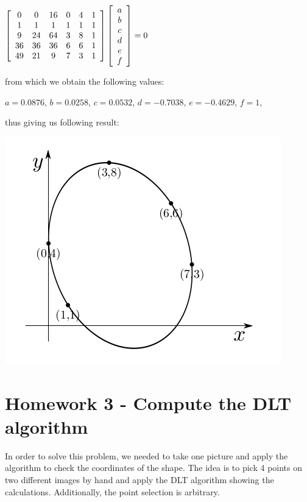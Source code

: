 \documentclass[]{article}
\begin{document}
\centerline {
	$\left[ {\begin{array}{*{20}c}
			0 & 0 & 16 & 0 & 4 & 1 \\
			1 & 1 & 1  & 1 & 1 & 1 \\
			9 & 24 & 64  & 3 & 8 & 1 \\
			36 & 36 & 36  & 6 & 6 & 1 \\
			49 & 21 & 9  & 7 & 3 & 1\\   
	\end{array} } \right] 
	\left[ {\begin{array}{*{20}c}
			a \\ 
			b \\ 
			c \\ 
			d \\ 
			e \\ 
			f    
	\end{array} } \right] = 0 $
}

from which we obtain the following values:

\centerline {
	$a = 0.0876$, $b = 0.0258$, $c = 0.0532$, $d = -0.7038$, $e = -0.4629$, $f = 1$,  
}

thus giving us following result:

\centerline {
\includegraphics[scale=0.5]{scr1}
}


\section{Homework 3 - Compute the DLT algorithm}
In order to solve this problem, we needed to take one picture and apply the algorithm to check the coordinates of the shape. The idea is to pick 4 points on two different images by hand and apply the DLT algorithm showing the calculations. Additionally, the point selection is arbitrary. 
\end{document}
